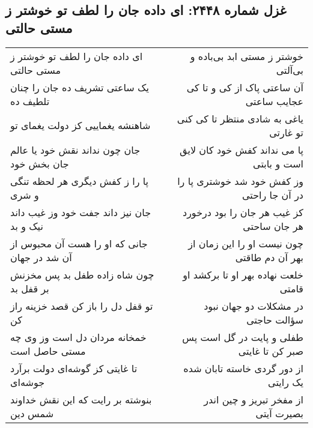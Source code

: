 \begin{center}
\section*{غزل شماره ۲۴۴۸: ای داده جان را لطف تو خوشتر ز مستی حالتی}
\label{sec:2448}
\begin{longtable}{l p{0.5cm} r}
ای داده جان را لطف تو خوشتر ز مستی حالتی
&&
خوشتر ز مستی ابد بی‌باده و بی‌آلتی
\\
یک ساعتی تشریف ده جان را چنان تلطیف ده
&&
آن ساعتی پاک از کی و تا کی عجایب ساعتی
\\
شاهنشه یغماییی کز دولت یغمای تو
&&
یاغی به شادی منتظر تا کی کنی تو غارتی
\\
جان چون نداند نقش خود یا عالم جان بخش خود
&&
پا می نداند کفش خود کان لایق است و بابتی
\\
پا را ز کفش دیگری هر لحظه تنگی و شری
&&
وز کفش خود شد خوشتری پا را در آن جا راحتی
\\
جان نیز داند جفت خود وز غیب داند نیک و بد
&&
کز غیب هر جان را بود درخورد هر جان ساحتی
\\
جانی که او را هست آن محبوس از آن شد در جهان
&&
چون نیست او را این زمان از بهر آن دم طاقتی
\\
چون شاه زاده طفل بد پس مخزنش بر قفل بد
&&
خلعت نهاده بهر او تا برکشد او قامتی
\\
تو قفل دل را باز کن قصد خزینه راز کن
&&
در مشکلات دو جهان نبود سؤالت حاجتی
\\
خمخانه مردان دل است وز وی چه مستی حاصل است
&&
طفلی و پایت در گل است پس صبر کن تا غایتی
\\
تا غایتی کز گوشه‌ای دولت برآرد جوشه‌ای
&&
از دور گردی خاسته تابان شده یک رایتی
\\
بنوشته بر رایت که این نقش خداوند شمس دین
&&
از مفخر تبریز و چین اندر بصیرت آیتی
\\
\end{longtable}
\end{center}
